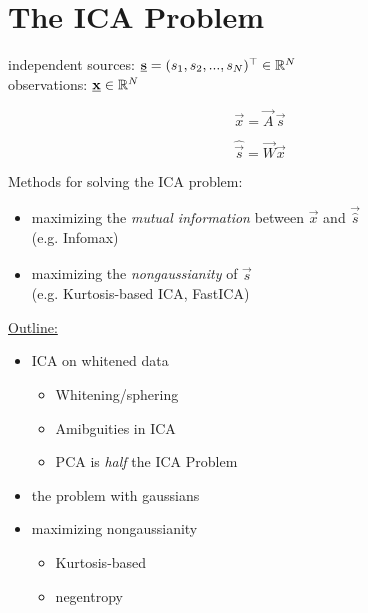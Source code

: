 
\section{The ICA Problem}
\begin{frame}{\secname}

independent sources: $\underline{\mathbf{s}} = (s_1, s_2,...,s_N)^\top \in \mathbb{R}^N$\\
observations: $\underline{\mathbf{x}} \in \mathbb{R}^N$

\begin{equation}
\label{eq:ica}
\vec x = \vec A \, \vec s
\end{equation}

\begin{equation}
\widehat{\vec s} = \vec W \vec x
\end{equation}

Methods for solving the ICA problem:

\begin{itemize}
\item maximizing the \emph{mutual information} between $\vec x$ and $\vec {\hat s}$ \\
(e.g. Infomax)
\item maximizing the \emph{nongaussianity} of $\widehat {\vec s}$ \\
(e.g. Kurtosis-based ICA, FastICA)
\end{itemize}
\end{frame}

\begin{frame}
\underline{Outline:}
\begin{itemize}
    \item ICA on whitened data
    \begin{itemize}
        \item Whitening/sphering
        \item Amibguities in ICA
        \item PCA is \emph{half} the ICA Problem
    \end{itemize}
    \item the problem with gaussians
    \item maximizing nongaussianity
    \begin{itemize}
        \item Kurtosis-based
        \item negentropy
    \end{itemize}
\end{itemize}
\end{frame}

